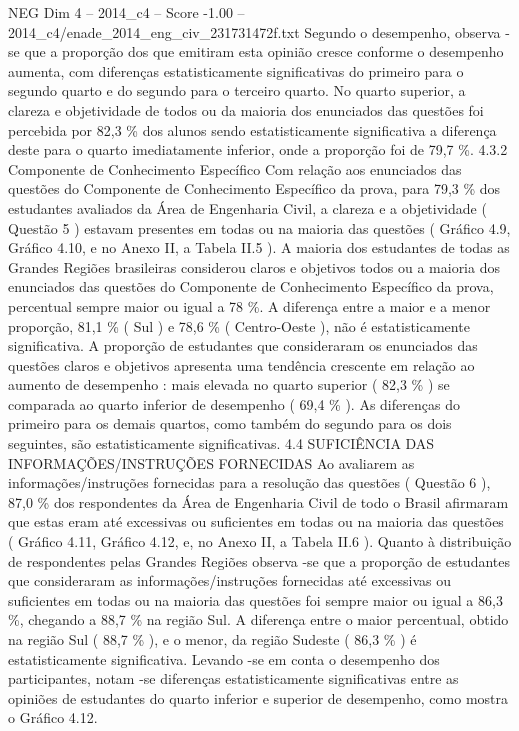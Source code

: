 \begin{textsample}{NEG Dim 4 – 2014\_c4 – Score -1.00 – 2014\_c4/enade\_2014\_eng\_civ\_231731472f.txt}
Segundo o desempenho, observa -se que a proporção dos que emitiram esta opinião cresce conforme o desempenho aumenta, com diferenças estatisticamente significativas do primeiro para o segundo quarto e do segundo para o terceiro quarto.
No quarto superior, a clareza e objetividade de todos ou da maioria dos enunciados das questões foi percebida por 82,3 \% dos alunos sendo estatisticamente significativa a diferença deste para o quarto imediatamente inferior, onde a proporção foi de 79,7 \%. 4.3.2 Componente de Conhecimento Específico Com relação aos enunciados das questões do Componente de Conhecimento Específico da prova, para 79,3 \% dos estudantes avaliados da Área de Engenharia Civil, a clareza e a objetividade ( Questão 5 ) estavam presentes em todas ou na maioria das questões ( Gráfico 4.9, Gráfico 4.10, e no Anexo II, a Tabela II.5 ).
A maioria dos estudantes de todas as Grandes Regiões brasileiras considerou claros e objetivos todos ou a maioria dos enunciados das questões do Componente de Conhecimento Específico da prova, percentual sempre maior ou igual a 78 \%.
A diferença entre a maior e a menor proporção, 81,1 \% ( Sul ) e 78,6 \% ( Centro-Oeste ), não é estatisticamente significativa.
A proporção de estudantes que consideraram os enunciados das questões claros e objetivos apresenta uma tendência crescente em relação ao aumento de desempenho : mais elevada no quarto superior ( 82,3 \% ) se comparada ao quarto inferior de desempenho ( 69,4 \% ).
As diferenças do primeiro para os demais quartos, como também do segundo para os dois seguintes, são estatisticamente significativas. 4.4 SUFICIÊNCIA DAS INFORMAÇÕES/INSTRUÇÕES FORNECIDAS Ao avaliarem as informações/instruções fornecidas para a resolução das questões ( Questão 6 ), 87,0 \% dos respondentes da Área de Engenharia Civil de todo o Brasil afirmaram que estas eram até excessivas ou suficientes em todas ou na maioria das questões ( Gráfico 4.11, Gráfico 4.12, e, no Anexo II, a Tabela II.6 ).
Quanto à distribuição de respondentes pelas Grandes Regiões observa -se que a proporção de estudantes que consideraram as informações/instruções fornecidas até excessivas ou suficientes em todas ou na maioria das questões foi sempre maior ou igual a 86,3 \%, chegando a 88,7 \% na região Sul.
A diferença entre o maior percentual, obtido na região Sul ( 88,7 \% ), e o menor, da região Sudeste ( 86,3 \% ) é estatisticamente significativa.
Levando -se em conta o desempenho dos participantes, notam -se diferenças estatisticamente significativas entre as opiniões de estudantes do quarto inferior e superior de desempenho, como mostra o Gráfico 4.12.

\end{textsample}
